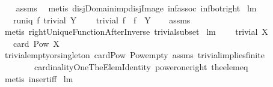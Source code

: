 \begin{isabellebody}
%
\isadelimproof
\ \ %
\endisadelimproof
%
\isatagproof
{}\isamarkupfalse%
\ assms\ \isamarkupfalse%
\ {\isacharparenleft}metis\ disj{\isacharunderscore}Domain{\isacharunderscore}imp{\isacharunderscore}disj{\isacharunderscore}Image\ inf{\isacharunderscore}assoc\ inf{\isacharunderscore}bot{\isacharunderscore}right{\isacharparenright}%
\endisatagproof
{\isafoldproof}%
%
\isadelimproof
\isanewline
%
\endisadelimproof
\isanewline
{}\isamarkupfalse%
\ lm{}{}{}{\isacharcolon}\ \isanewline
\ \ \ {\isachardoublequoteopen}runiq\ f{\isachardoublequoteclose}\ {\isachardoublequoteopen}trivial\ Y{\isachardoublequoteclose}\ \isanewline
\ \ \ {\isachardoublequoteopen}trivial\ {\isacharparenleft}f\ {\isacharbackquote}{\isacharbackquote}\ {\isacharparenleft}f{\isacharcircum}{\isacharminus}{}\ {\isacharbackquote}{\isacharbackquote}\ Y{\isacharparenright}{\isacharparenright}{\isachardoublequoteclose}\isanewline
%
\isadelimproof
\ \ %
\endisadelimproof
%
\isatagproof
{}\isamarkupfalse%
\ assms\ \isamarkupfalse%
\ {\isacharparenleft}metis\ rightUniqueFunctionAfterInverse\ trivial{\isacharunderscore}subset{\isacharparenright}%
\endisatagproof
{\isafoldproof}%
%
\isadelimproof
\isanewline
%
\endisadelimproof
\isanewline
{}\isamarkupfalse%
\ lm{}{}{}{\isacharcolon}\ \isanewline
\ \ \ {\isachardoublequoteopen}trivial\ X{\isachardoublequoteclose}\ \isanewline
\ \ \ {\isachardoublequoteopen}card\ {\isacharparenleft}Pow\ X{\isacharparenright}{\isasymin}{\isacharbraceleft}{}{\isacharcomma}{}{\isacharbraceright}{\isachardoublequoteclose}\ \isanewline
%
\isadelimproof
\ \ %
\endisadelimproof
%
\isatagproof
{}\isamarkupfalse%
\ trivial{\isacharunderscore}empty{\isacharunderscore}or{\isacharunderscore}singleton\ card{\isacharunderscore}Pow\ Pow{\isacharunderscore}empty\ assms\ trivial{\isacharunderscore}implies{\isacharunderscore}finite\isanewline
\ \ \ \ \ \ \ \ cardinalityOneTheElemIdentity\ power{\isacharunderscore}one{\isacharunderscore}right\ the{\isacharunderscore}elem{\isacharunderscore}eq\ \isanewline
\ \ \isamarkupfalse%
\ {\isacharparenleft}metis\ insert{\isacharunderscore}iff{\isacharparenright}%
\endisatagproof
{\isafoldproof}%
%
\isadelimproof
\isanewline
%
\endisadelimproof
\isanewline
{}\isamarkupfalse%
\ lm{}{}{}{\isacharcolon}\ \isanewline

\end{isabellebody}
